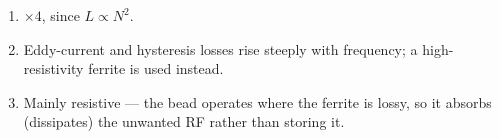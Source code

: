 \begin{enumerate}[leftmargin=1.6em,itemsep=2pt]
\item $\times 4$, since $L \propto N^{2}$.
\item Eddy-current and hysteresis losses rise steeply with frequency; a high-resistivity ferrite is used instead.
\item Mainly resistive --- the bead operates where the ferrite is lossy, so it absorbs (dissipates) the unwanted RF rather than storing it.
\end{enumerate}
